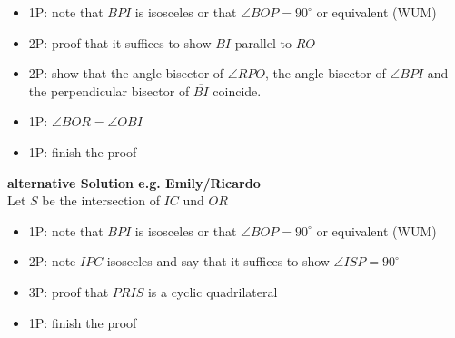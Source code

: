 \begin{itemize}
\item 1P: note that $BPI$ is isosceles or that $\angle BOP = 90^\circ$ or equivalent (WUM)
\item 2P: proof that it suffices to show $BI$ parallel to $RO$
\item 2P: show that the angle bisector of $\angle RPO$, the angle bisector of $\angle BPI$ and the perpendicular bisector of $\overline{BI}$ coincide.
\item 1P: $\angle BOR = \angle OBI $
\item 1P: finish the proof
\end{itemize}
$ $
\\
\textbf{alternative Solution e.g. Emily/Ricardo}\\
Let $S$ be the intersection of $IC$ und $OR$
\begin{itemize}
\item 1P: note that $BPI$ is isosceles or that $\angle BOP = 90^\circ$ or equivalent (WUM)
\item 2P: note $IPC$ isosceles and say that it suffices to show $\angle ISP = 90^\circ$
\item 3P: proof that $PRIS$ is a cyclic quadrilateral
\item 1P: finish the proof
\end{itemize}
